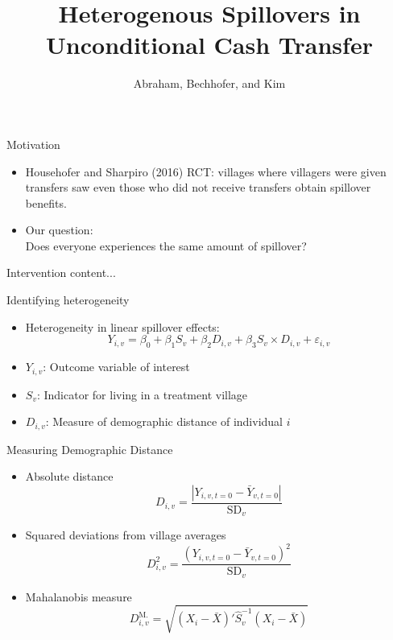 \documentclass[14pt, aspectratio=169]{beamer}
\title[Heteregenous Spillovers in Unconditional Cash Transfer] %
{Heterogenous Spillovers in Unconditional Cash Transfer}
\author[Abraham, Bechhofer, and Kim] %
{Abraham, Bechhofer, and Kim }
\begin{document}
\begin{frame}
  \titlepage
\end{frame}

\begin{frame}{Motivation}
\begin{itemize}
	\item Househofer and Sharpiro (2016) RCT: villages where villagers were given transfers saw even those who did not receive transfers obtain spillover benefits.
	\item Our question: \\ Does everyone experiences the same amount of spillover? 
\end{itemize}
\end{frame}

\begin{frame}{Intervention}
content...
\end{frame}

\begin{frame}{Identifying heterogeneity}
\begin{itemize}
	\item Heterogeneity in linear spillover effects:
	\begin{equation*} \label{eq:interaction}
	Y_{i,v} = \beta_0 + \beta_1 S_v + \beta_2 D_{i,v} + \beta_3 S_v \times  D_{i,v} + \varepsilon_{i,v}
	\end{equation*}
	
	\item $Y_{i,v}$: Outcome variable of interest 
    \item $S_v$: Indicator for living in a treatment village 
    \item $D_{i,v}$: Measure of demographic distance of individual $i$
 
\end{itemize}
\end{frame}

\begin{frame}{Measuring Demographic Distance}
\begin{itemize}
	\item Absolute distance
	$$D_{i,v}  = \frac{|Y_{i,v,t=0} - \bar Y_{v,t=0}|}{\text{SD}_v} $$
	\item Squared deviations from village averages
	$$ D^2_{i,v}= \frac{(Y_{i,v,t=0} - \bar Y_{v,t=0})^2}{\text{SD}_v} $$
	\item Mahalanobis measure
	$$D^\text{M.}_{i,v} = \sqrt{( X_i - {\bar X})' {\hat S}^{-1}_v ( X_i - {\bar X})}  $$ 
\end{itemize}
\end{frame}
\end{document}

